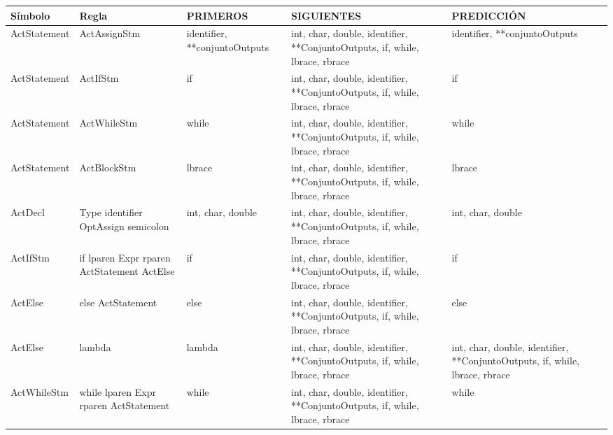 \begin{tabularx}{\textwidth}{BBBBB}
          \toprule
          Símbolo & Regla & PRIMEROS & SIGUIENTES & PREDICCIÓN \\ \hline
          \midrule
          ActStatement & ActAssignStm & identifier, **conjuntoOutputs & int, char, double, identifier, **ConjuntoOutputs, if, while, lbrace, rbrace & identifier, **conjuntoOutputs \\ \hline
               ActStatement & ActIfStm & if    & int, char, double, identifier, **ConjuntoOutputs, if, while, lbrace, rbrace & if \\ \hline
               ActStatement & ActWhileStm & while & int, char, double, identifier, **ConjuntoOutputs, if, while, lbrace, rbrace & while \\ \hline
               ActStatement & ActBlockStm & lbrace & int, char, double, identifier, **ConjuntoOutputs, if, while, lbrace, rbrace & lbrace \\ \hline
                     
               ActDecl & Type identifier OptAssign semicolon & int, char, double & int, char, double, identifier, **ConjuntoOutputs, if, while, lbrace, rbrace & int, char, double \\ \hline
                     
               ActIfStm & if lparen Expr rparen ActStatement ActElse & if    & int, char, double, identifier, **ConjuntoOutputs, if, while, lbrace, rbrace & if \\ \hline
               ActElse & else ActStatement & else  & int, char, double, identifier, **ConjuntoOutputs, if, while, lbrace, rbrace & else \\ \hline
               ActElse & lambda & lambda & int, char, double, identifier, **ConjuntoOutputs, if, while, lbrace, rbrace & int, char, double, identifier, **ConjuntoOutputs, if, while, lbrace, rbrace \\ \hline
                     
               ActWhileStm & while lparen Expr rparen ActStatement & while & int, char, double, identifier, **ConjuntoOutputs, if, while, lbrace, rbrace & while \\ \hline

           \bottomrule
               \end{tabularx}%


